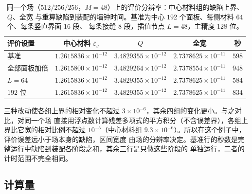 \begin{table}[htbp]
  \centering
  \small
  \setlength{\tabcolsep}{4pt}
  \caption{同一个场（$512/256/256$，$M=48$）上的评价分辨率：中心材料组的缺陷上界、$Q$、全宽
  与重算缺陷到装配的墙钟时间。基准为中心 $192$ 个面板、每侧材料 $64$ 个、每条竖直界面 $16$ 段、
  每条接缝 $8$ 段，插值节点 $L=48$，主精度 $128$ 位。}
  \label{tab:results-eval}
  \begin{tabular}{lcccc}
    \toprule
    评价设置 & 中心材料 $\overline\varepsilon_g$ & $Q$ & 全宽 & 秒\\
    \midrule
    基准 & $1.2615836\times10^{-12}$ & $3.4829355\times10^{-12}$ & $2.7378625\times10^{-11}$ & $598$\\
    全部面板加倍 & $1.2615800\times10^{-12}$ & $3.4829264\times10^{-12}$ & $2.7378554\times10^{-11}$ & $948$\\
    $L=64$ & $1.2615836\times10^{-12}$ & $3.4829355\times10^{-12}$ & $2.7378625\times10^{-11}$ & $584$\\
    $192$ 位 & $1.2615836\times10^{-12}$ & $3.4829355\times10^{-12}$ & $2.7378625\times10^{-11}$ & $834$\\
    \bottomrule
  \end{tabular}
\end{table}
三种改动使各组上界的相对变化不超过 $3\times10^{-6}$，其余四组的变化更小。与之对比，对同一个场
直接用浮点数计算残差多项式的平方积分（不含误差界），各组上界比它宽的相对比例不超过
$10^{-5}$（中心材料组 $9.3\times10^{-6}$）。所以在这个例子中，评价误差远小于场本身的缺陷，区间宽度
由场的分辨率决定。基准行的秒数是完整运行中缺陷到装配各阶段之和，其余三行是只做这些阶段的
单独运行，二者的计时范围不完全相同。

\subsection{计算量}
\label{subsec:results-cost}

